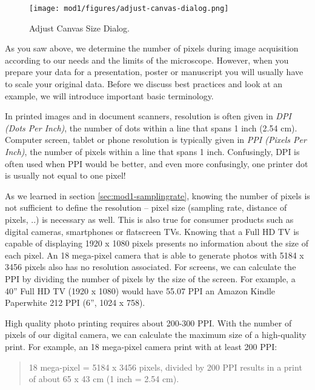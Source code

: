 \begin{figure}[!ht]
	\captionsetup{justification=centering}
	\centering
		\texttt{[image: mod1/figures/adjust-canvas-dialog.png]}
		\caption{Adjust Canvas Size Dialog.}\label{fig:adjust-canvas-dialog}
\end{figure}

As you saw above, we determine the number of pixels during image acquisition according to our needs and the limits of the microscope. However, when you prepare your data for a presentation, poster or manuscript you will usually have to scale your original data. Before we discuss best practices and look at an example, we will introduce important basic terminology.


In printed images and in document scanners, resolution is often given in \emph{DPI (Dots Per Inch)}, the number of dots within a line that spans 1 inch (2.54 cm). Computer screen, tablet or phone resolution is typically given in \emph{PPI (Pixels Per Inch)}, the number of pixels within a line that spans 1 inch. Confusingly, DPI is often used when PPI would be better, and even more confusingly, one printer dot is usually not equal to one pixel! 

As we learned in section \ref{sec:mod1-samplingrate}, knowing the
number of pixels is not sufficient to define the resolution -- pixel
size (sampling rate, distance of pixels, ..) is necessary as
well. This is also true for consumer products such as digital cameras,
smartphones or flatscreen TVs. Knowing that a Full HD TV is capable of
displaying 1920 x 1080 pixels presents no information about the size
of each pixel. An 18 mega-pixel camera that is able to generate photos
with 5184 x 3456 pixels also has no resolution associated. For
screens, we can calculate the PPI by dividing the number of pixels by
the size of the screen. For example, a 40'' Full HD TV (1920 x 1080) would have 55.07 PPI an Amazon Kindle Paperwhite 212 PPI (6'', 1024 x 758). 

High quality photo printing requires about 200-300 PPI. With the number of pixels of our digital camera, we can calculate the maximum size of a high-quality print. For example, an 18 mega-pixel camera print with at least 200 PPI: 

\begin{quotation}
	18 mega-pixel = 5184 x 3456 pixels, divided by 200 PPI results in a print of about 65 x 43 cm (1 inch = 2.54 cm).
\end{quotation}

